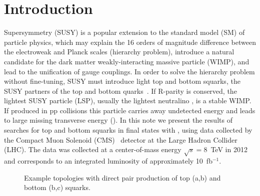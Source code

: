 \section{Introduction}
\label{sec:intro}

Supersymmetry (SUSY) is a popular extension to the standard model (SM) of particle physics, which may explain
the 16 orders of magnitude difference between the electroweak and Planck scales (hierarchy problem), introduce
a natural candidate for the dark matter weakly-interacting massive particle (WIMP), and lead to the unification of
gauge couplings.
In order to solve the hierarchy problem without fine-tuning, SUSY must introduce
light top and bottom squarks, the SUSY partners of the top and bottom quarks~\cite{ref:naturalsusy}.
If R-parity is conserved, the lightest SUSY particle (LSP),
usually the lightest neutralino \lsp, is a stable WIMP. If produced in pp collisions this
particle carries away undetected energy and leads to large missing transverse energy (\met).
In this note we present the results of searches for top and bottom squarks in final states with \met, 
using data collected by the Compact Muon Solenoid (CMS)~\cite{ref:CMS} detector at the
Large Hadron Collider (LHC). The data was collected at a center-of-mass energy $\sqrt{s}=8$~TeV in 2012
and corresponds to an integrated luminosity of approximately 10~fb$^{-1}$.

\begin{figure}
\begin{center}
\quad
{}\quad
{}
\caption{Example topologies with direct pair production of top (a,b) and bottom (b,c) squarks.
\label{fig:diagrams}
}
\end{center}
\end{figure}


